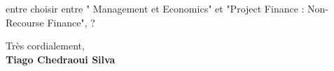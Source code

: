 \documentclass[11pt]{article}
\newcommand{\red}[1]{{\color{red}{#1}}}
\begin{document}

\red{J'hésite}  entre  choisir entre  "  Management  et  Economics" et  "Project
Finance : Non-Recourse Finance", \red{qu'en pensez vous}? %

Très cordialement,\\[2em] %
%
{\bfseries Tiago Chedraoui Silva}\\
%
\vfill%
\end{document}
